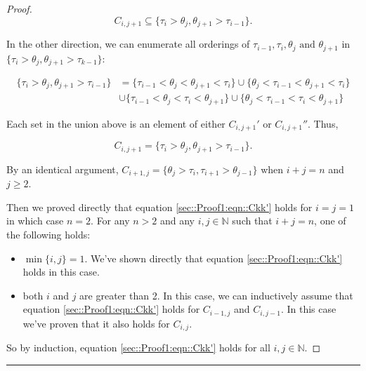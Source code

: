 \documentclass[12pt]{article}
\newcommand{\mb}{\mathbb}
\newcommand{\te}{\text}
\newcommand{\lin}{\rule{\linewidth}{0.4 pt}}
\newcommand{\indx}[1]{_{#1}}					%
\newcommand{\rt}{\tau}							%
\newcommand{\rtt}{\theta}						%
\renewcommand{\it}{k}							%
\newcommand{\pathsete}[2]{C_{#1,#2}}			%
\begin{document}
\begin{proof}
\[\pathsete{i}{j+1} \subseteq \{\rt\indx{i} > \rtt\indx{j},\rtt\indx{j+1} > \rt\indx{i-1}\}.\]

In the other direction, we can enumerate all orderings of \(\rt\indx{i-1},\rt\indx{i},\rtt\indx{j}\te{ and } \rtt\indx{j+1}\) in \(\{\rt\indx{i} > \rtt\indx{j}, \rtt\indx{j+1} > \rt\indx{\it-1}\}\):

\begin{align*}
\{\rt\indx{i} > \rtt\indx{j},\rtt\indx{j+1} > \rt\indx{i-1}\} &= \{\rt\indx{i-1} < \rtt\indx{j} < \rtt\indx{j+1} < \rt\indx{i}\} \cup \{\rtt\indx{j} < \rt\indx{i-1} < \rtt\indx{j+1} < \rt\indx{i}\}\\
&\cup \{\rt\indx{i-1} < \rtt\indx{j} < \rt\indx{i} < \rtt\indx{j+1}\} \cup \{\rtt\indx{j} < \rt\indx{i-1} <\rt\indx{i} < \rtt\indx{j+1}\}
\end{align*}

Each set in the union above is an element of either \(\pathsete{i}{j+1}'\) or \(\pathsete{i}{j+1}''\). Thus,

\[\pathsete{i}{j+1} = \{\rt\indx{i} > \rtt\indx{j},\rtt\indx{j+1} > \rt\indx{i-1}\}.\]

By an identical argument, \(\pathsete{i+1}{j} = \{\rtt\indx{j} > \rt\indx{i},\rt\indx{i+1} > \rtt\indx{j-1}\}\) when \(i + j = n\) and \(j \geq 2\).

Then we proved directly that equation \eqref{sec::Proof1:eqn::Ckk'} holds for \(i = j=1\) in which case \(n = 2\). For any \(n > 2\) and any \(i,j\in \mb{N}\) such that \(i + j = n\), one of the following holds:

\begin{itemize}
\item \(\min\{i,j\} = 1\). We've shown directly that equation \eqref{sec::Proof1:eqn::Ckk'} holds in this case.

\item both \(i\) and \(j\) are greater than 2. In this case, we can inductively assume that equation \eqref{sec::Proof1:eqn::Ckk'} holds for \(\pathsete{i-1}{j}\) and \(\pathsete{i}{j-1}\). In this case we've proven that it also holds for \(\pathsete{i}{j}\).
\end{itemize}

So by induction, equation \eqref{sec::Proof1:eqn::Ckk'} holds for all \(i,j\in \mb{N}\).
\end{proof}

\lin
\end{document}
